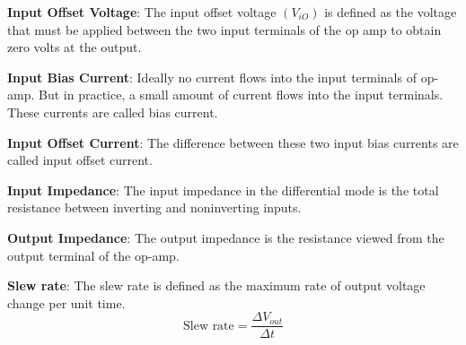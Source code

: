 \documentclass[12pt]{article}
\begin{document}
\pagebreak
\vspace*{-\baselineskip}
\textbf{Input Offset Voltage}: The input offset voltage $(V_{iO})$ is defined as the voltage that must be applied between the two input terminals of the op amp to obtain zero volts at the output.

\vspace{2ex}
\textbf{Input Bias Current}: Ideally no current flows into the input terminals of op-amp. But in practice, a small amount of current flows into the input terminals. These currents are called bias current.

\vspace{2ex}
\textbf{Input Offset Current}: The difference between these two input bias currents are called input offset current.

\vspace{2ex}
\textbf{Input Impedance}: The input impedance in the differential mode is the total resistance between inverting and noninverting inputs.

\vspace{2ex}
\textbf{Output Impedance}: The output impedance is the resistance viewed from the output terminal of the op-amp.

\vspace{2ex}
\textbf{Slew rate}: The slew rate is defined as the maximum rate of output voltage change per unit time.
\vspace{-0.5\baselineskip}
$$\text{Slew rate} = \frac{\Delta V_{out}}{\Delta t}$$
\end{document}

